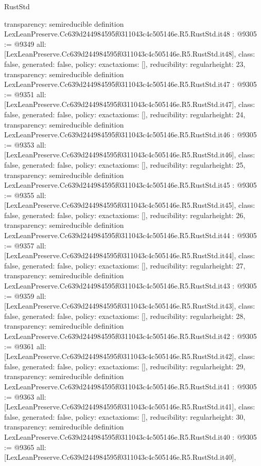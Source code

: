 \begin{lexlean}{RustStd}
\begin{coremodule}
{  transparency: semireducible
}
definition LexLeanPreserve.Cc639d244984595f0311043c4c505146e.R5.RustStd.it48 : @9305 := @9349 {
  all: [LexLeanPreserve.Cc639d244984595f0311043c4c505146e.R5.RustStd.it48],
  class: false,
  generated: false,
  policy: exact{axioms: []},
  reducibility: regular{height: 23},
  transparency: semireducible
}
definition LexLeanPreserve.Cc639d244984595f0311043c4c505146e.R5.RustStd.it47 : @9305 := @9351 {
  all: [LexLeanPreserve.Cc639d244984595f0311043c4c505146e.R5.RustStd.it47],
  class: false,
  generated: false,
  policy: exact{axioms: []},
  reducibility: regular{height: 24},
  transparency: semireducible
}
definition LexLeanPreserve.Cc639d244984595f0311043c4c505146e.R5.RustStd.it46 : @9305 := @9353 {
  all: [LexLeanPreserve.Cc639d244984595f0311043c4c505146e.R5.RustStd.it46],
  class: false,
  generated: false,
  policy: exact{axioms: []},
  reducibility: regular{height: 25},
  transparency: semireducible
}
definition LexLeanPreserve.Cc639d244984595f0311043c4c505146e.R5.RustStd.it45 : @9305 := @9355 {
  all: [LexLeanPreserve.Cc639d244984595f0311043c4c505146e.R5.RustStd.it45],
  class: false,
  generated: false,
  policy: exact{axioms: []},
  reducibility: regular{height: 26},
  transparency: semireducible
}
definition LexLeanPreserve.Cc639d244984595f0311043c4c505146e.R5.RustStd.it44 : @9305 := @9357 {
  all: [LexLeanPreserve.Cc639d244984595f0311043c4c505146e.R5.RustStd.it44],
  class: false,
  generated: false,
  policy: exact{axioms: []},
  reducibility: regular{height: 27},
  transparency: semireducible
}
definition LexLeanPreserve.Cc639d244984595f0311043c4c505146e.R5.RustStd.it43 : @9305 := @9359 {
  all: [LexLeanPreserve.Cc639d244984595f0311043c4c505146e.R5.RustStd.it43],
  class: false,
  generated: false,
  policy: exact{axioms: []},
  reducibility: regular{height: 28},
  transparency: semireducible
}
definition LexLeanPreserve.Cc639d244984595f0311043c4c505146e.R5.RustStd.it42 : @9305 := @9361 {
  all: [LexLeanPreserve.Cc639d244984595f0311043c4c505146e.R5.RustStd.it42],
  class: false,
  generated: false,
  policy: exact{axioms: []},
  reducibility: regular{height: 29},
  transparency: semireducible
}
definition LexLeanPreserve.Cc639d244984595f0311043c4c505146e.R5.RustStd.it41 : @9305 := @9363 {
  all: [LexLeanPreserve.Cc639d244984595f0311043c4c505146e.R5.RustStd.it41],
  class: false,
  generated: false,
  policy: exact{axioms: []},
  reducibility: regular{height: 30},
  transparency: semireducible
}
definition LexLeanPreserve.Cc639d244984595f0311043c4c505146e.R5.RustStd.it40 : @9305 := @9365 {
  all: [LexLeanPreserve.Cc639d244984595f0311043c4c505146e.R5.RustStd.it40],
}
\end{coremodule}
\end{lexlean}

